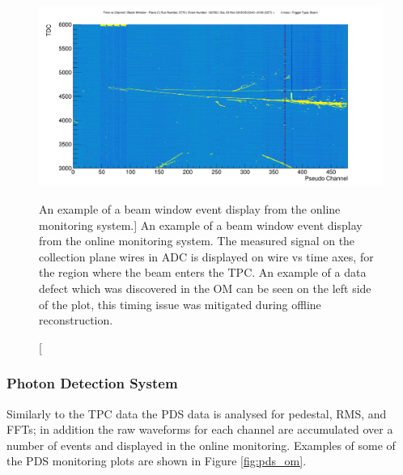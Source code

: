 \begin{figure}

	\centering

	\includegraphics[width=\textwidth]{figures/beam_evd.png}

	\caption
	[An example of a beam window event display from the \protodune{} online
	monitoring system.]
	{An example of a beam window event display from the \protodune{} online
	monitoring system. The measured signal on the collection plane wires in ADC 
	is displayed on wire vs time axes, for the region where the beam enters the 
	TPC. An example of a data defect which was discovered in the OM can be seen 
	on the left side of the plot, this timing issue was mitigated during offline
	reconstruction.}

	\label{fig:beam_evd}

\end{figure}

\subsubsection*{Photon Detection System}
Similarly to the TPC data the PDS data is analysed for pedestal, RMS, and FFTs;
in addition the raw waveforms for each channel are accumulated over a number of
events and displayed in the online monitoring. Examples of some of the PDS 
monitoring plots are shown in Figure \ref{fig:pds_om}.

